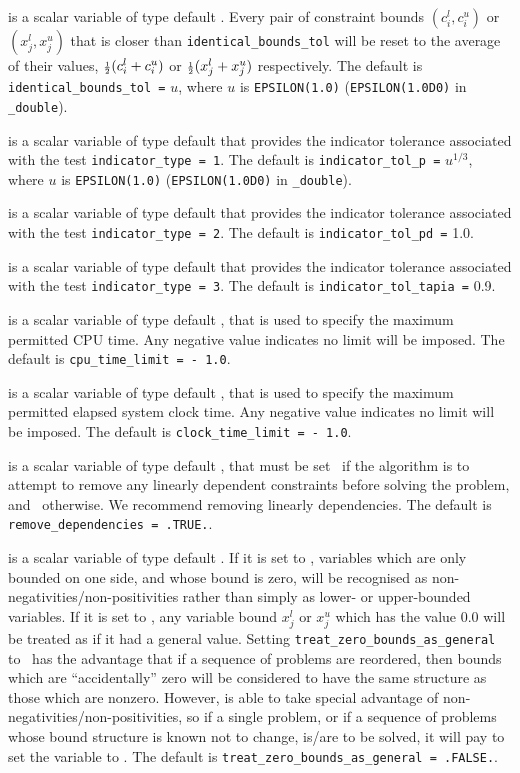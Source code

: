 \begin{description}
is a scalar variable of type default \realdp.
Every pair of constraint bounds
$(c_{i}^{l}, c_{i}^{u})$ or $(x_{j}^{l}, x_{j}^{u})$
that is closer than {\tt identical\_bounds\_tol}
will be reset to the average of their values,
${\scriptstyle \frac{1}{2}} (c_{i}^{l} + c_{i}^{u})$ or ${\scriptstyle \frac{1}{2}} (x_{j}^{l} + x_{j}^{u})$
respectively.
The default is {\tt identical\_bounds\_tol =} $u$,
where $u$ is {\tt EPSILON(1.0)} ({\tt EPSILON(1.0D0)} in
{\tt \fullpackagename\_double}).

is a scalar variable of type default \realdp that
provides the indicator tolerance associated with the test
{\tt indicator\_type = 1}.
The default is {\tt indicator\_tol\_p =} $u^{1/3}$,
where $u$ is {\tt EPSILON(1.0)} ({\tt EPSILON(1.0D0)} in
{\tt \fullpackagename\_double}).

is a scalar variable of type default \realdp that
provides the indicator tolerance associated with the test
{\tt indicator\_type = 2}.
The default is {\tt indicator\_tol\_pd =} 1.0.

is a scalar variable of type default \realdp that
provides the indicator tolerance associated with the test
{\tt indicator\_type = 3}.
The default is {\tt indicator\_tol\-\_tapia =} 0.9.

 is a scalar variable of type default \realdp,
that is used to specify the maximum permitted CPU time. Any negative
value indicates no limit will be imposed. The default is
{\tt cpu\_time\_limit = - 1.0}.

 is a scalar variable of type default \realdp,
that is used to specify the maximum permitted elapsed system clock time.
Any negative value indicates no limit will be imposed. The default is
{\tt clock\_time\_limit = - 1.0}.

 is a scalar variable of type
default \logical, that must be set \true\ if the algorithm
is to attempt to remove any linearly dependent constraints before
solving the problem, and \false\ otherwise.
We recommend removing linearly dependencies.
The default is {\tt remove\_dependencies = .TRUE.}.

 is a scalar variable of type
default \logical.
If it is set to \false, variables which
are only bounded on one side, and whose bound is zero,
will be recognised as non-negativities/non-positivities rather than simply as
lower- or upper-bounded variables.
If it is set to \true, any variable bound
$x_{j}^{l}$ or $x_{j}^{u}$ which has the value 0.0 will be
treated as if it had a general value.
Setting {\tt treat\_zero\_bounds\_as\_general} to \true\ has the advantage
that if a sequence of problems are reordered, then bounds which are
``accidentally'' zero will be considered to have the same structure as
those which are nonzero. However, {\tt \fullpackagename} is
able to take special advantage of non-negativities/non-positivities, so
if a single problem, or if a sequence of problems whose
bound structure is known not to change, is/are to be solved,
it will pay to set the variable to \false.
The default is {\tt treat\_zero\_bounds\_as\_general = .FALSE.}.


\end{description}
